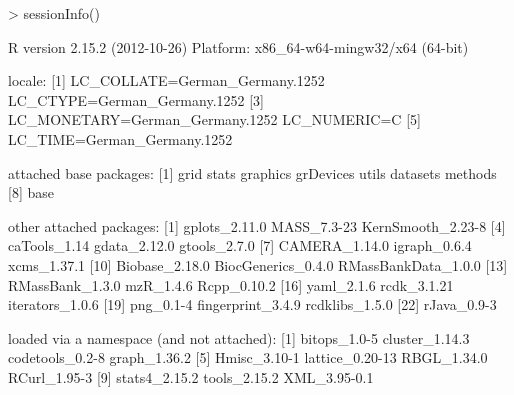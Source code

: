\documentclass[letterpaper, 11pt]{article}
\begin{document}
\begin{Schunk}
\begin{Sinput}
> sessionInfo()
\end{Sinput}
\begin{Soutput}
R version 2.15.2 (2012-10-26)
Platform: x86_64-w64-mingw32/x64 (64-bit)

locale:
[1] LC_COLLATE=German_Germany.1252  LC_CTYPE=German_Germany.1252   
[3] LC_MONETARY=German_Germany.1252 LC_NUMERIC=C                   
[5] LC_TIME=German_Germany.1252    

attached base packages:
[1] grid      stats     graphics  grDevices utils     datasets  methods  
[8] base     

other attached packages:
 [1] gplots_2.11.0       MASS_7.3-23         KernSmooth_2.23-8  
 [4] caTools_1.14        gdata_2.12.0        gtools_2.7.0       
 [7] CAMERA_1.14.0       igraph_0.6.4        xcms_1.37.1        
[10] Biobase_2.18.0      BiocGenerics_0.4.0  RMassBankData_1.0.0
[13] RMassBank_1.3.0     mzR_1.4.6           Rcpp_0.10.2        
[16] yaml_2.1.6          rcdk_3.1.21         iterators_1.0.6    
[19] png_0.1-4           fingerprint_3.4.9   rcdklibs_1.5.0     
[22] rJava_0.9-3        

loaded via a namespace (and not attached):
 [1] bitops_1.0-5    cluster_1.14.3  codetools_0.2-8 graph_1.36.2   
 [5] Hmisc_3.10-1    lattice_0.20-13 RBGL_1.34.0     RCurl_1.95-3   
 [9] stats4_2.15.2   tools_2.15.2    XML_3.95-0.1   
\end{Soutput}
\end{Schunk}
\end{document}

